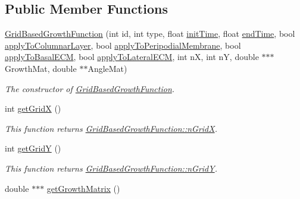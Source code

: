 \subsection*{Public Member Functions}
\begin{DoxyCompactItemize}
\item 
\hyperlink{classGridBasedGrowthFunction_aed515e78b2dbcf81751b44cb0c2bef58}{Grid\+Based\+Growth\+Function} (int id, int type, float \hyperlink{classGrowthFunctionBase_ae92513a7b41637df8e26e7db35ddf97c}{init\+Time}, float \hyperlink{classGrowthFunctionBase_a3ff4db0573d354a75666a5f3ca446941}{end\+Time}, bool \hyperlink{classGrowthFunctionBase_a3d56771e7c145589a14e11cc331e0326}{apply\+To\+Columnar\+Layer}, bool \hyperlink{classGrowthFunctionBase_a08ae19f58cb98fa8e315a77f52749732}{apply\+To\+Peripodial\+Membrane}, bool \hyperlink{classGrowthFunctionBase_a9fe46fc6dde4041b79204beb48972a09}{apply\+To\+Basal\+E\+C\+M}, bool \hyperlink{classGrowthFunctionBase_ac623b1dbe376bce5dddbe1a2e21c776f}{apply\+To\+Lateral\+E\+C\+M}, int n\+X, int n\+Y, double $\ast$$\ast$$\ast$Growth\+Mat, double $\ast$$\ast$Angle\+Mat)
\begin{DoxyCompactList}\small\item\em The constructor of \hyperlink{classGridBasedGrowthFunction}{Grid\+Based\+Growth\+Function}. \end{DoxyCompactList}\item 
\hypertarget{classGridBasedGrowthFunction_ae36e6ea2e7bdf41459e74d5846d6d24d}{}int \hyperlink{classGridBasedGrowthFunction_ae36e6ea2e7bdf41459e74d5846d6d24d}{get\+Grid\+X} ()\label{classGridBasedGrowthFunction_ae36e6ea2e7bdf41459e74d5846d6d24d}

\begin{DoxyCompactList}\small\item\em This function returns \hyperlink{classGridBasedGrowthFunction_af872b9963f3a579dcd615c23bcb58a86}{Grid\+Based\+Growth\+Function\+::n\+Grid\+X}. \end{DoxyCompactList}\item 
\hypertarget{classGridBasedGrowthFunction_a4a70e9e187e3079e29115f106d30e26e}{}int \hyperlink{classGridBasedGrowthFunction_a4a70e9e187e3079e29115f106d30e26e}{get\+Grid\+Y} ()\label{classGridBasedGrowthFunction_a4a70e9e187e3079e29115f106d30e26e}

\begin{DoxyCompactList}\small\item\em This function returns \hyperlink{classGridBasedGrowthFunction_a625bc963a1f1e7d1f1a35dbd0ef51728}{Grid\+Based\+Growth\+Function\+::n\+Grid\+Y}. \end{DoxyCompactList}\item 
\hypertarget{classGridBasedGrowthFunction_ac25ac1f12b74816a1d3d3e5dda0e8541}{}double $\ast$$\ast$$\ast$ \hyperlink{classGridBasedGrowthFunction_ac25ac1f12b74816a1d3d3e5dda0e8541}{get\+Growth\+Matrix} ()\label{classGridBasedGrowthFunction_ac25ac1f12b74816a1d3d3e5dda0e8541}


\end{DoxyCompactItemize}
